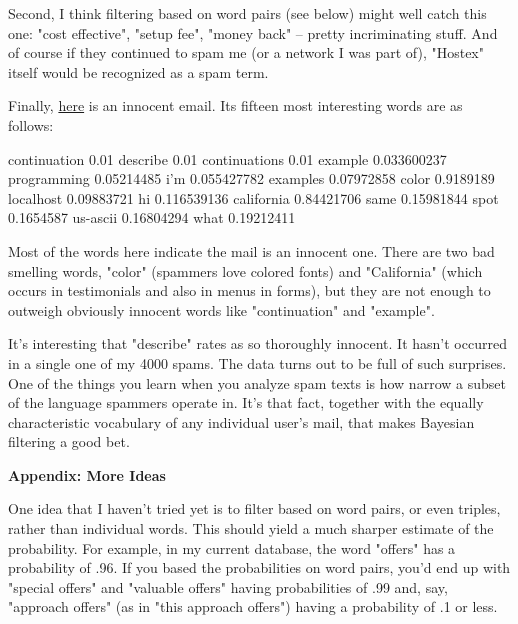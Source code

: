 Second, I
                    think filtering based on word pairs (see below) might well
                    catch this one: "cost effective", "setup fee", "money back"
                    -- pretty incriminating stuff. And of course if they
                    continued to spam me (or a network I was part of), "Hostex"
                    itself would be recognized as a spam term.

Finally,
                    \href{https://sep.turbifycdn.com/ty/cdn/paulgraham/legit.txt?t=1688221954\&}{here}
                    is an innocent email. Its fifteen most interesting words are
                    as follows:
                    
                      
continuation  0.01
describe      0.01
continuations 0.01
example       0.033600237
programming   0.05214485 
i'm           0.055427782
examples      0.07972858 
color         0.9189189  
localhost     0.09883721
hi            0.116539136
california    0.84421706
same          0.15981844
spot          0.1654587
us-ascii      0.16804294
what          0.19212411

                    
                    Most of the words here indicate the mail is an innocent one.
                    There are two bad smelling words, "color" (spammers love
                    colored fonts) and "California" (which occurs in
                    testimonials and also in menus in forms), but they are not
                    enough to outweigh obviously innocent words like
                    "continuation" and "example".

It's interesting
                    that "describe" rates as so thoroughly innocent. It hasn't
                    occurred in a single one of my 4000 spams. The data turns
                    out to be full of such surprises. One of the things you
                    learn when you analyze spam texts is how narrow a subset of
                    the language spammers operate in. It's that fact, together
                    with the equally characteristic vocabulary of any individual
                    user's mail, that makes Bayesian filtering a good bet.

\textbf{Appendix: More Ideas}

One idea that I haven't tried yet is to filter
                    based on word pairs, or even triples, rather than individual
                    words. This should yield a much sharper estimate of the
                    probability. For example, in my current database, the word
                    "offers" has a probability of .96. If you based the
                    probabilities on word pairs, you'd end up with "special
                    offers" and "valuable offers" having probabilities of .99
                    and, say, "approach offers" (as in "this approach offers")
                    having a probability of .1 or less.

